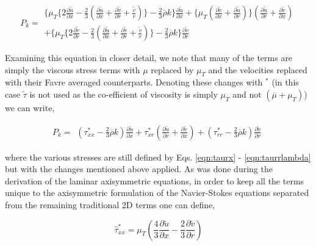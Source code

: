 \begin{equation}
	P_k = 
	\begin{array}{c}
	\Bigg\{ \mu_T\Big\{2\frac{\partial \tilde{u}}{\partial x} - \frac{2}{3}
	(\frac{\partial \tilde{u}}{\partial x} + \frac{\partial \tilde{v}}{\partial r} + \frac{\tilde{v}}{r})\Big\}
	-\frac{2}{3}\overline{\rho}k\Bigg\} \frac{\partial \tilde u}{\partial x}  
	+ \Big\{ \mu_T(\frac{\partial \tilde{v}}{\partial x} + \frac{\partial \tilde{u}}{\partial r})\Big\}
	(\frac{\partial \tilde u}{\partial r} + \frac{\partial \tilde v}{\partial x})
	\\ + \Bigg\{ \mu_T\Big\{2\frac{\partial \tilde{v}}{\partial r} - \frac{2}{3}
	(\frac{\partial \tilde{u}}{\partial x} + \frac{\partial \tilde{v}}{\partial r} + \frac{\tilde{v}}{r})\Big\}
	-\frac{2}{3}\overline{\rho}k \Bigg\} \frac{\partial \tilde v}{\partial r}
	\end{array}
\label{eqn:pknotaus}
\end{equation}

	Examining this equation in closer detail, we note that many of the terms are simply the
viscous stress terms with $\mu$ replaced by $\mu_T$ and the velocities replaced with their Favre averaged counterparts.
Denoting these changes with $^*$ (in this case $\tilde \tau$ is not used as the co-efficient of viscosity is simply
$\mu_T$ and not $(\overline{\mu} + \mu_T)$) we can write,

\begin{equation}
	P_k = 
	\begin{array}{c}
	(\tau^*_{xx} -\frac{2}{3}\overline{\rho}k) \frac{\partial \tilde u}{\partial x}  
	+ \tau^*_{xr} (\frac{\partial \tilde u}{\partial r} + \frac{\partial \tilde v}{\partial x})
	+ (\tau^*_{rr} -\frac{2}{3}\overline{\rho}k) \frac{\partial \tilde v}{\partial r}
	\end{array}
\label{eqn:pktaus}
\end{equation} 

	where the various stresses are still defined by Eqs. \ref{eqn:taurx} - \ref{eqn:taurrlambda} but with the 
changes mentioned above applied.  As was done during the derivation of the laminar axisymmetric equations, in order to 
keep all the terms unique to the axisymmetric formulation of the Navier-Stokes equations separated from the remaining 
traditional 2D terms one can define,

\begin{equation}
	\hat{\tau}^*_{xx} = \mu_T(\frac{4}{3}\frac{\partial \tilde u}{\partial x}-\frac{2}{3}\frac{\partial \tilde v}{\partial r})
\label{eqn:tauxxhatstar}
\end{equation}

